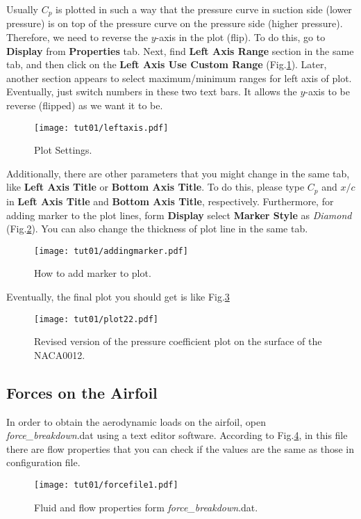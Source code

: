 Usually $C_p$ is plotted in such a way that the pressure curve in suction side (lower pressure) is on top of the pressure curve on the pressure side (higher pressure). Therefore, we need to reverse  the $y$-axis in the plot (flip). To do this, go to \textbf{Display} from \textbf{Properties} tab. Next, find \textbf{Left Axis Range} section in the same tab, and then click on the \textbf{Left Axis Use Custom Range} (Fig.\ref{fig:viewsetting}). Later, another section appears to select maximum/minimum ranges for left axis of plot. Eventually, just switch numbers in these two text bars. It allows the $y$-axis to be reverse (flipped) as we want it to be.
\begin{figure}[htbp]
    \centering
    \texttt{[image: tut01/leftaxis.pdf]}
    \caption{Plot Settings.}
    \label{fig:viewsetting}
\end{figure}
Additionally, there are other parameters that you might change in the same tab, like \textbf{Left Axis Title} or  \textbf{Bottom Axis Title}. To do this, please type $C_p$ and $x/c$ in \textbf{Left Axis Title} and \textbf{Bottom Axis Title}, respectively. Furthermore, for adding marker to the plot lines, form \textbf{Display} select \textbf{Marker Style} as \textit{Diamond} (Fig.\ref{fig:marker}). You can also change the thickness of plot line in the same tab.
\begin{figure}[htbp]
    \centering
    \texttt{[image: tut01/addingmarker.pdf]}
    \caption{How to add marker to plot.}
    \label{fig:marker}
\end{figure}
Eventually, the final plot you should get is like Fig.\ref{fig:surface_pressure2}
\begin{figure}[htbp]
    \centering
    \texttt{[image: tut01/plot22.pdf]}
    \caption{Revised version of the pressure coefficient plot on the surface of the NACA0012.}
    \label{fig:surface_pressure2}
\end{figure}
\subsection{Forces on the Airfoil}
In order to obtain the aerodynamic loads on the airfoil, open \textit{force\_breakdown}.dat using a text editor software. According to Fig.\ref{fig:forcefile1}, in this file there are flow properties that you can check if the values are the same as those in configuration file. 
\begin{figure}[htbp]
    \centering
    \texttt{[image: tut01/forcefile1.pdf]}
    \caption{Fluid and flow properties form \textit{force\_breakdown}.dat.}
    \label{fig:forcefile1}
\end{figure}

